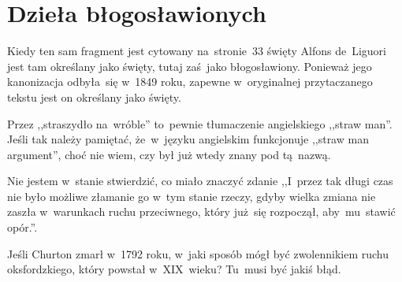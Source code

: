 \documentclass[a4paper,11pt]{article}
\begin{document}
\vspace{\spaceTwo}







\newpage
\section{Dzieła błogosławionych}

\vspace{\spaceTwo}






\start {} Kiedy ten sam fragment jest cytowany
na~stronie~33 święty Alfons de~Liguori jest tam określany jako święty,
tutaj zaś~jako błogosławiony. Ponieważ jego kanonizacja odbyła~się
w~1849 roku, zapewne w~oryginalnej przytaczanego tekstu jest on
określany jako święty.

\vspace{\spaceFour}


\start {} Przez ,,straszydło na~wróble'' to~pewnie
tłumaczenie angielskiego ,,straw man''. Jeśli tak należy pamiętać,
że~w~języku angielskim funkcjonuje ,,straw man argument'', choć nie
wiem, czy był już wtedy znany pod tą~nazwą.

\vspace{\spaceFour}


\start {} Nie jestem w~stanie stwierdzić, co miało znaczyć
zdanie ,,I~przez tak długi czas nie było możliwe złamanie go w~tym
stanie rzeczy, gdyby wielka zmiana nie zaszła w~warunkach ruchu
przeciwnego, który już~się rozpoczął, aby~mu~stawić opór.''.

\vspace{\spaceFour}


\start {} Jeśli Churton zmarł w~1792 roku, w~jaki sposób
mógł być zwolennikiem ruchu oksfordzkiego, który powstał w~XIX~wieku?
Tu~musi być jakiś błąd.

\vspace{\spaceFour}
\end{document}
